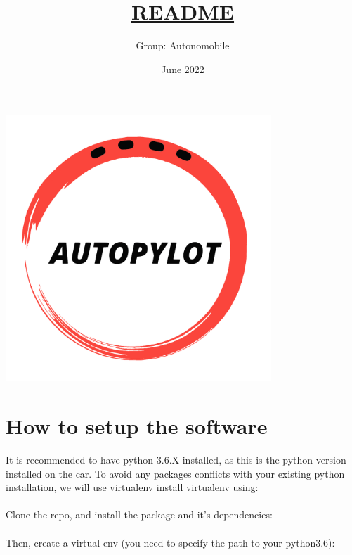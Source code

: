 \documentclass[12pt]{article}
\begin{document}
\title{\underline{README}}
\date{June 2022}


\author{%
    Group: Autonomobile 
    }

\maketitle

\centerline{\includegraphics[height=10cm]{../../logos/logo-transparent-black.png}}
\newpage

\tableofcontents
\newpage
\section{How to setup the software}

It is recommended to have python 3.6.X installed, as this is the python version installed on the car.
To avoid any packages conflicts with your existing python installation, we will use virtualenv install virtualenv using:\\

\noindent{}\\

Clone the repo, and install the package and it's dependencies:\\

\noindent{}\\

Then, create a virtual env (you need to specify the path to your python3.6):\\
\end{document}

